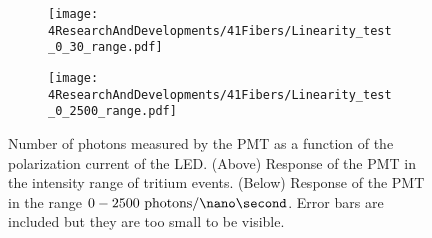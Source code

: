 \begin{figure}
\centering
    \begin{subfigure}[b]{1\textwidth}
    \centering
    \texttt{[image: 4ResearchAndDevelopments/41Fibers/Linearity\_test\_0\_30\_range.pdf]}  
    \caption{\label{subfig:LinearityTritiumRange}}
    \end{subfigure}
    \hfill
    \begin{subfigure}[b]{1\textwidth}
    \centering
    \texttt{[image: 4ResearchAndDevelopments/41Fibers/Linearity\_test\_0\_2500\_range.pdf]}  
    \caption{\label{subfig:LinearityStudyRange}}
    \end{subfigure}
 \caption{Number of photons measured by the PMT as a function of the polarization current of the LED. (Above) Response of the PMT in the intensity range of tritium events. (Below) Response of the PMT in the range $0-2500~\text{photons}/\nano\second$. Error bars are included but they are too small to be visible.}
 \label{fig:LinearityRangesOfPMT}
\end{figure}